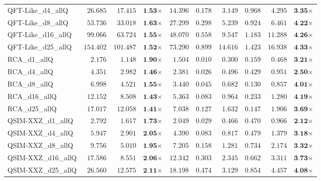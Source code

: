 \begin{table*}[t]
{\begin{tabular}{| l || r r c || r r r r r c |}
QFT-Like\_d4\_allQ & $26.685$ & $17.415$ & $\textbf{1.53}$$\times$ & $14.396$ & $0.178$ & $3.149$ & $0.968$ & $4.295$ & $\textbf{3.35}$$\times$ \\
QFT-Like\_d8\_allQ & $53.736$ & $33.018$ & $\textbf{1.63}$$\times$ & $27.299$ & $0.298$ & $5.239$ & $0.924$ & $6.461$ & $\textbf{4.22}$$\times$ \\
QFT-Like\_d16\_allQ & $99.066$ & $63.724$ & $\textbf{1.55}$$\times$ & $48.070$ & $0.558$ & $9.547$ & $1.183$ & $11.288$ & $\textbf{4.26}$$\times$ \\
QFT-Like\_d25\_allQ & $154.402$ & $101.487$ & $\textbf{1.52}$$\times$ & $73.290$ & $0.899$ & $14.616$ & $1.423$ & $16.938$ & $\textbf{4.33}$$\times$ \\
RCA\_d1\_allQ & $2.176$ & $1.148$ & $\textbf{1.90}$$\times$ & $1.504$ & $0.010$ & $0.300$ & $0.159$ & $0.468$ & $\textbf{3.21}$$\times$ \\
RCA\_d4\_allQ & $4.351$ & $2.982$ & $\textbf{1.46}$$\times$ & $2.381$ & $0.026$ & $0.496$ & $0.429$ & $0.951$ & $\textbf{2.50}$$\times$ \\
RCA\_d8\_allQ & $6.998$ & $4.521$ & $\textbf{1.55}$$\times$ & $3.440$ & $0.045$ & $0.682$ & $0.130$ & $0.857$ & $\textbf{4.01}$$\times$ \\
RCA\_d16\_allQ & $12.152$ & $8.508$ & $\textbf{1.43}$$\times$ & $5.363$ & $0.083$ & $0.964$ & $0.233$ & $1.280$ & $\textbf{4.19}$$\times$ \\
RCA\_d25\_allQ & $17.017$ & $12.058$ & $\textbf{1.41}$$\times$ & $7.038$ & $0.127$ & $1.632$ & $0.147$ & $1.906$ & $\textbf{3.69}$$\times$ \\
QSIM-XXZ\_d1\_allQ & $2.792$ & $1.617$ & $\textbf{1.73}$$\times$ & $2.049$ & $0.029$ & $0.466$ & $0.470$ & $0.966$ & $\textbf{2.12}$$\times$ \\
QSIM-XXZ\_d4\_allQ & $5.947$ & $2.901$ & $\textbf{2.05}$$\times$ & $4.390$ & $0.083$ & $0.817$ & $0.479$ & $1.379$ & $\textbf{3.18}$$\times$ \\
QSIM-XXZ\_d8\_allQ & $9.756$ & $5.010$ & $\textbf{1.95}$$\times$ & $7.205$ & $0.158$ & $1.281$ & $0.734$ & $2.174$ & $\textbf{3.32}$$\times$ \\
QSIM-XXZ\_d16\_allQ & $17.586$ & $8.551$ & $\textbf{2.06}$$\times$ & $12.342$ & $0.303$ & $2.345$ & $0.662$ & $3.311$ & $\textbf{3.73}$$\times$ \\
QSIM-XXZ\_d25\_allQ & $26.560$ & $12.575$ & $\textbf{2.11}$$\times$ & $18.198$ & $0.474$ & $3.129$ & $0.854$ & $4.457$ & $\textbf{4.08}$$\times$ \\
\hline
\end{tabular}
}
\end{table*}

